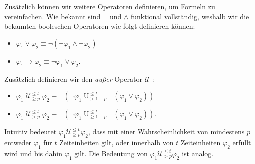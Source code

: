 \documentclass{lni}
\theoremstyle{def_style}
\theoremstyle{break}
\newcommand{\UEqual}[4]{#1\operatorname{U}^{\leq #2}_{\geq #3}#4}
\newcommand{\UStrict}[4]{#1\operatorname{U}^{\leq #2}_{> #3}#4}
\newcommand{\WeakEqual}[4]{#1\operatorname{\mathcal{U}}^{\leq #2}_{\geq #3}#4}
\newcommand{\WeakStrict}[4]{#1\operatorname{\mathcal{U}}^{\leq #2}_{> #3}#4}
\begin{document}
Zusätzlich können wir weitere Operatoren definieren, um Formeln zu vereinfachen.
Wie bekannt sind $\neg$ und $\land$ funktional vollständig, weshalb wir die bekannten booleschen Operatoren wie folgt definieren können:
\begin{itemize}
	\item $\varphi_1 \lor \varphi_2 \equiv \neg(\neg\varphi_1 \land \neg\varphi_2)$
	\item $\varphi_1 \rightarrow \varphi_2 \equiv \neg\varphi_1 \lor \varphi_2$.
\end{itemize}
Zusätzlich definieren wir den \textit{außer} Operator $\mathcal{U}$ \cite{hansson1994logic}:
\begin{itemize}
	\item $ \WeakEqual{\varphi_1}{t}{p}{\varphi_2} \equiv \neg(\UStrict{\neg\varphi_1}{t}{1-p}{\neg(\varphi_1\lor\varphi_2)})$
	\item $ \WeakStrict{\varphi_1}{t}{p}{\varphi_2} \equiv \neg(\UEqual{\neg\varphi_1}{t}{1-p}{\neg(\varphi_1\lor\varphi_2)})$.
\end{itemize}
Intuitiv bedeutet $\varphi_1 \mathcal{U}^{\leq t}_{\geq p}\varphi_2$, dass mit einer Wahrscheinlichkeit von mindestens $p$ entweder $\varphi_1$ für $t$ Zeiteinheiten gilt, oder innerhalb von $t$ Zeiteinheiten $\varphi_2$ erfüllt wird und bis dahin $\varphi_1$ gilt. Die Bedeutung von $\varphi_1 \mathcal{U}^{\leq t}_{>p}\varphi_2$ ist analog. \cite{hansson1994logic}
\end{document}
